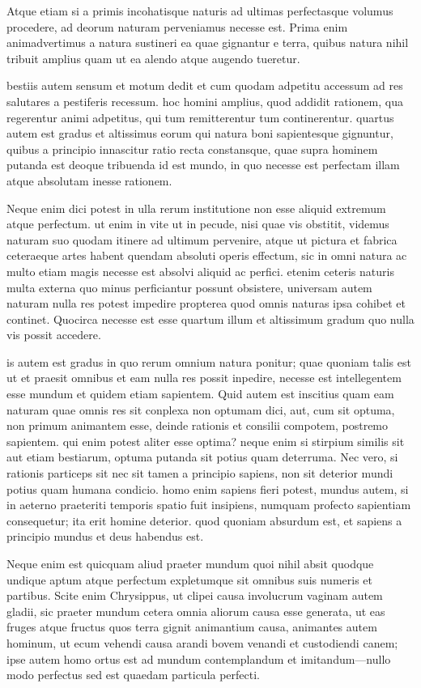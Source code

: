  Atque etiam si a primis incohatisque naturis ad ultimas perfectasque volumus procedere, ad deorum naturam perveniamus necesse est. Prima enim animadvertimus a natura sustineri ea quae gignantur e terra, quibus natura nihil tribuit amplius quam ut ea alendo atque augendo tueretur.

 bestiis autem sensum et motum dedit et cum quodam adpetitu accessum ad res salutares a pestiferis recessum. hoc homini amplius, quod addidit rationem, qua regerentur animi adpetitus, qui tum remitterentur tum continerentur. quartus autem est gradus et altissimus eorum qui natura boni sapientesque gignuntur, quibus a principio innascitur ratio recta constansque, quae supra hominem putanda est deoque tribuenda id est mundo, in quo necesse est perfectam illam atque absolutam inesse rationem.

 Neque enim dici potest in ulla rerum institutione non esse aliquid extremum atque perfectum. ut enim in vite ut in pecude, nisi quae vis obstitit, videmus naturam suo quodam itinere ad ultimum pervenire, atque ut pictura et fabrica ceteraeque artes habent quendam absoluti operis effectum, sic in omni natura ac multo etiam magis necesse est absolvi aliquid ac perfici. etenim ceteris naturis multa externa quo minus perficiantur possunt obsistere, universam autem naturam nulla res potest impedire propterea quod omnis naturas ipsa cohibet et continet. Quocirca necesse est esse quartum illum et altissimum gradum quo nulla vis possit accedere.

 is autem est gradus in quo rerum omnium natura ponitur; quae quoniam talis est ut et praesit omnibus et eam nulla res possit inpedire, necesse est intellegentem esse mundum et quidem etiam sapientem. Quid autem est inscitius quam eam naturam quae omnis res sit conplexa non optumam dici, aut, cum sit optuma, non primum animantem esse, deinde rationis et consilii compotem, postremo sapientem. qui enim potest aliter esse optima? neque enim si stirpium similis sit aut etiam bestiarum, optuma putanda sit potius quam deterruma. Nec vero, si rationis particeps sit nec sit tamen a principio sapiens, non sit deterior mundi potius quam humana condicio. homo enim sapiens fieri potest, mundus autem, si in aeterno praeteriti temporis spatio fuit insipiens, numquam profecto sapientiam consequetur; ita erit homine deterior. quod quoniam absurdum est, et sapiens a principio mundus et deus habendus est.

 Neque enim est quicquam aliud praeter mundum quoi nihil absit quodque undique aptum atque perfectum expletumque sit omnibus suis numeris et partibus. Scite enim Chrysippus, ut clipei causa involucrum vaginam autem gladii, sic praeter mundum cetera omnia aliorum causa esse generata, ut eas fruges atque fructus quos terra gignit animantium causa, animantes autem hominum, ut ecum vehendi causa arandi bovem venandi et custodiendi canem; ipse autem homo ortus est ad mundum contemplandum et imitandum—nullo modo perfectus sed est quaedam particula perfecti.

